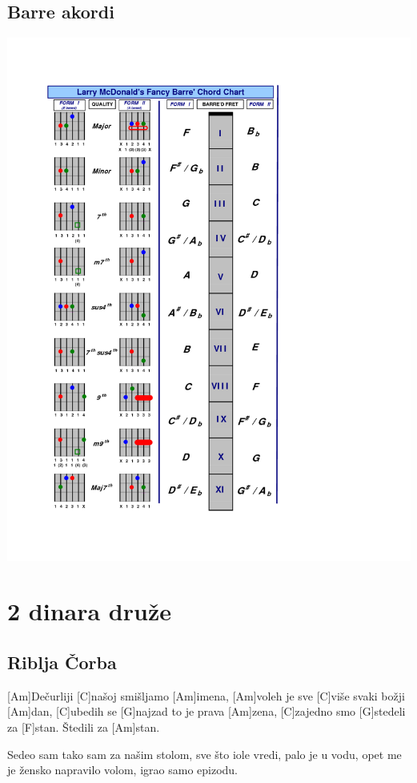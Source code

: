 \documentclass[a4paper,12pt]{article}
\begin{document}
\begin{multicols}{2}
\subsection*{Barre akordi}
\includegraphics[width=140mm]{img/barre.png}
\clearpage
\section{2 dinara druže}
\subsection*{Riblja Čorba}
\begin{guitar}
[Am Am9 Am10/C Am9 Am]

[Am]Dečurliji [C]našoj smišljamo [Am]imena,
[Am]voleh je sve [C]više svaki božji [Am]dan,  
[C]ubedih se [G]najzad to je prava [Am]zena,      
[C]zajedno smo [G]stedeli za [F]stan.
Štedili za [Am]stan.


Sedeo sam tako sam za našim stolom,
sve što iole vredi, palo je u vodu,
opet me je žensko napravilo volom,
igrao samo epizodu.



\end{guitar}
\end{multicols}
\end{document}
